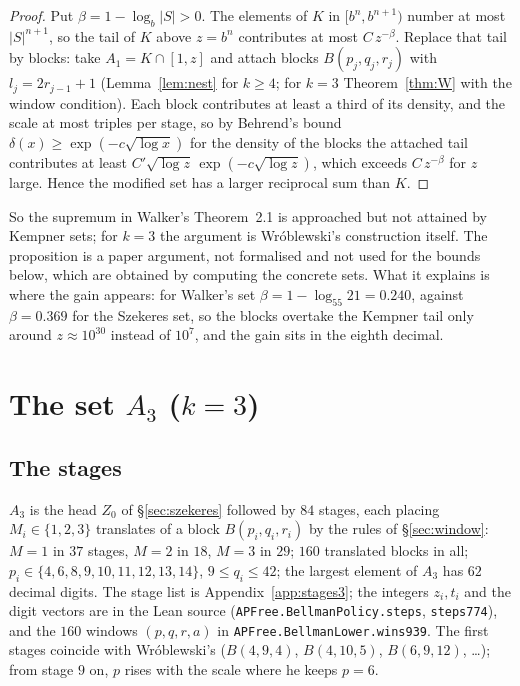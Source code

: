 \documentclass[11pt,a4paper]{article}
\theoremstyle{definition}
\theoremstyle{remark}
\newcommand{\Blk}{B}
\newcommand{\code}[1]{\texttt{#1}}
\begin{document}
\begin{proof}
Put $\beta=1-\log_b|S|>0$. The elements of $K$ in $[b^n,b^{n+1})$ number at most $|S|^{n+1}$, so the tail of $K$ above $z=b^n$ contributes at most $C\,z^{-\beta}$. Replace that tail by blocks: take $A_1=K\cap[1,z]$ and attach blocks $\Blk(p_j,q_j,r_j)$ with $l_j=2r_{j-1}+1$ (Lemma~\ref{lem:nest} for $k\ge4$; for $k=3$ Theorem~\ref{thm:W} with the window condition). Each block contributes at least a third of its density, and the scale at most triples per stage, so by Behrend's bound $\delta(x)\ge\exp(-c\sqrt{\log x})$ for the density of the blocks the attached tail contributes at least $C'\sqrt{\log z}\,\exp(-c\sqrt{\log z})$, which exceeds $C\,z^{-\beta}$ for $z$ large. Hence the modified set has a larger reciprocal sum than $K$.
\end{proof}

So the supremum in Walker's Theorem~2.1 is approached but not attained by Kempner sets; for $k=3$ the argument is Wr\'oblewski's construction itself. The proposition is a paper argument, not formalised and not used for the bounds below, which are obtained by computing the concrete sets. What it explains is where the gain appears: for Walker's set $\beta = 1 - \log_{55} 21 = 0.240$, against $\beta = 0.369$ for the Szekeres set, so the blocks overtake the Kempner tail only around $z \approx 10^{30}$ instead of $10^7$, and the gain sits in the eighth decimal.

\section{The set \texorpdfstring{$A_3$}{A3} (\texorpdfstring{$k = 3$}{k = 3})}\label{sec:A3}

\subsection{The stages}\label{sec:stages3}

$A_3$ is the head $Z_0$ of \S\ref{sec:szekeres} followed by $84$ stages, each placing $M_i \in \{1,2,3\}$ translates of a block $\Blk(p_i,q_i,r_i)$ by the rules of \S\ref{sec:window}: $M=1$ in $37$ stages, $M=2$ in $18$, $M=3$ in $29$; $160$ translated blocks in all; $p_i \in \{4,6,8,9,10,11,12,13,14\}$, $9 \le q_i \le 42$; the largest element of $A_3$ has $62$ decimal digits. The stage list is Appendix~\ref{app:stages3}; the integers $z_i, t_i$ and the digit vectors are in the Lean source (\code{APFree.\allowbreak{}BellmanPolicy.\allowbreak{}steps}, \code{steps774}), and the $160$ windows $(p,q,r,a)$ in \code{APFree.\allowbreak{}BellmanLower.\allowbreak{}wins939}. The first stages coincide with Wr\'oblewski's ($\Blk(4,9,4)$, $\Blk(4,10,5)$, $\Blk(6,9,12)$, \dots); from stage $9$ on, $p$ rises with the scale where he keeps $p = 6$.
\end{document}
